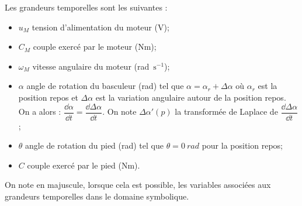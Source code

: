 Les grandeurs temporelles sont les suivantes :
\begin{itemize}
\item $u_M$ tension d'alimentation du moteur (V);
\item $C_M$ couple exercé par le moteur (Nm);
\item $\omega_M$ vitesse angulaire du moteur (rad\, $\text{s}^{-1}$);
\item $\alpha$ angle de rotation du basculeur (rad) tel que $\alpha=\alpha_r+\Delta \alpha$ où $\alpha_r$ est la position repos et $\Delta \alpha$  est la variation angulaire autour de la position repos. On a alors : $\dfrac{\dd \alpha}{\dd t}=\dfrac{\dd \Delta \alpha}{\dd t}$. On note $\Delta \alpha' ( p)$ la transformée de Laplace de $\dfrac{\dd \Delta \alpha}{\dd t}$;
\item $\theta$ angle de rotation du pied (rad) tel que $\theta = \SI{0}{rad}$ pour la position repos;
\item $C$ couple exercé par le pied (Nm).
\end{itemize}
On note en majuscule, lorsque cela est possible, les variables associées aux grandeurs temporelles dans le
domaine symbolique.
%
%
%
%
